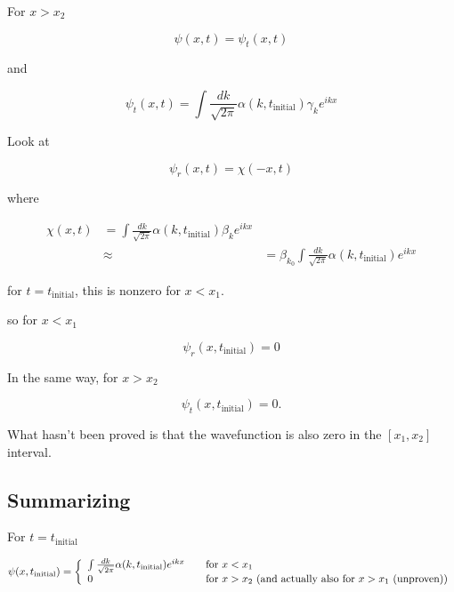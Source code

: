 For $x > x_2$ 

\begin{equation}\label{eqn:qmTwoL22:250}
\psi(x, t) = \psi_t(x, t) 
\end{equation}

and

\begin{equation}\label{eqn:qmTwoL22:230}
\psi_t(x, t) = \int \frac{dk}{\sqrt{2 \pi}} \alpha(k, t_{\text{initial}}) \gamma_k e^{i k x}
\end{equation}

Look at 

\begin{equation}\label{eqn:qmTwoL22:270}
\psi_r(x, t) = \chi(-x, t)
\end{equation}

where

\begin{equation}\label{eqn:qmTwoL22:290}
\begin{aligned}
\chi(x, t) 
&= \int \frac{dk}{\sqrt{2 \pi}} \alpha(k, t_{\text{initial}}) \beta_k e^{i k x} \\
&\approx 
&= \beta_{k_0} \int \frac{dk}{\sqrt{2 \pi}} \alpha(k, t_{\text{initial}}) e^{i k x} 
\end{aligned}
\end{equation}

for $t = t_{\text{initial}}$, this is nonzero for $x < x_1$.

so for $x < x_1$

\begin{equation}\label{eqn:qmTwoL22:310}
\psi_r(x, t_{\text{initial}}) = 0
\end{equation}

In the same way, for $x > x_2$ 

\begin{equation}\label{eqn:qmTwoL22:330}
\psi_t(x, t_{\text{initial}}) = 0.
\end{equation}

What hasn't been proved is that the wavefunction is also zero in the $[x_1, x_2]$ interval.

\subsection{Summarizing}

For $t = t_{\text{initial}}$ 

\begin{equation}\label{eqn:qmTwoL22:350}
\psi(x, t_{\text{initial}}) 
=
\left\{
\begin{array}{l l}
\int \frac{dk}{\sqrt{2 \pi}} \alpha(k, t_{\text{initial}}) e^{i k x} &\quad \mbox{for $x < x_1$} \\
0 & \quad \mbox{for $x > x_2$ (and actually also for $x > x_1$ (unproven))}
\end{array}
\right. 
\end{equation}

